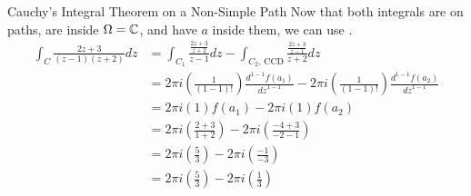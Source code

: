 \begin{example}{Cauchy's Integral Theorem on a Non-Simple Path}
  Now that both integrals are on  paths, are inside $\Omega = \operatorname{\mathbb{C}}$, and have $a$ inside them, we can use .
  \begin{align*}
    \int_{C} \frac{2z + 3}{(z-1) (z+2)} dz &= \int_{C_{1}} \frac{\frac{2z + 3}{z+2}}{z-1} dz - \int_{C_{2}\text{, CCD}} \frac{\frac{2z + 3}{z-1}}{z+2} dz \\
                                           &= 2 \pi i \left( \frac{1}{(1-1)!} \right) \frac{d^{1-1}f(a_{1})}{{dz}^{1-1}} - 2 \pi i \left( \frac{1}{(1-1)!} \right) \frac{d^{1-1}f(a_{2})}{{dz}^{1-1}} \\
                                           &= 2 \pi i (1) f(a_{1}) - 2 \pi i (1) f(a_{2}) \\
                                           &= 2 \pi i \left( \frac{2 + 3}{1 + 2} \right) - 2 \pi i \left( \frac{-4 + 3}{-2 - 1} \right) \\
                                           &= 2 \pi i \left( \frac{5}{3} \right) - 2 \pi i \left( \frac{-1}{-3} \right) \\
                                           &= 2 \pi i \left( \frac{5}{3} \right) - 2 \pi i \left( \frac{1}{3} \right)
  \end{align*}
\end{example}

